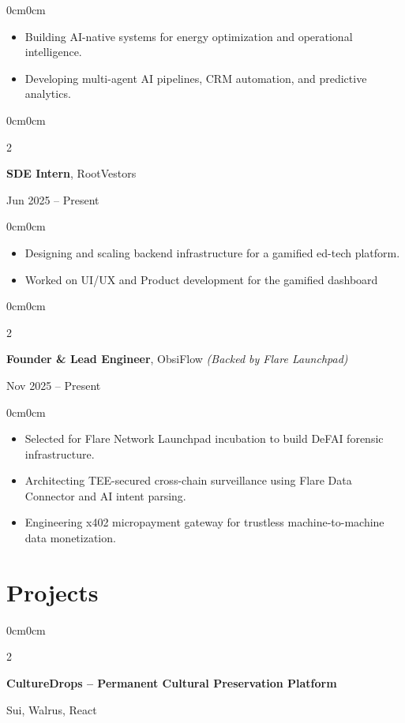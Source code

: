 \documentclass[10pt, letterpaper]{article}
\newenvironment{highlights}{
\begin{itemize}[topsep=1pt, parsep=0pt, partopsep=0pt, itemsep=1pt, leftmargin=10pt]
}{\end{itemize}}
\newenvironment{onecolentry}{\begin{adjustwidth}{0cm}{0cm}}{\end{adjustwidth}}
\newenvironment{twocolentry}[1]{
  \onecolentry
  \def\secondColumn{#1}
  \setcolumnwidth{\fill, 4.3cm}
  \begin{paracol}{2}
}{
  \switchcolumn \raggedleft \secondColumn
  \end{paracol}
  \endonecolentry
}
\begin{document}
\begin{onecolentry}
\begin{highlights}
  \item Building AI-native systems for energy optimization and operational intelligence.
  \item Developing multi-agent AI pipelines, CRM automation, and predictive analytics.
\end{highlights}
\end{onecolentry}

\begin{twocolentry}{Jun 2025 -- Present}
\textbf{SDE Intern}, RootVestors
\end{twocolentry}

\begin{onecolentry}
\begin{highlights}
  \item Designing and scaling backend infrastructure for a gamified ed-tech platform.  
  \item Worked on UI/UX and Product development for the gamified dashboard  
\end{highlights}
\end{onecolentry}

\begin{twocolentry}{Nov 2025 -- Present}
\textbf{Founder \& Lead Engineer}, ObsiFlow \textit{(Backed by Flare Launchpad)}
\end{twocolentry}

\begin{onecolentry}
\begin{highlights}
  \item Selected for Flare Network Launchpad incubation to build DeFAI forensic infrastructure.
  \item Architecting TEE-secured cross-chain surveillance using Flare Data Connector and AI intent parsing.
  \item Engineering x402 micropayment gateway for trustless machine-to-machine data monetization.
\end{highlights}
\end{onecolentry}

\section{Projects}

\begin{twocolentry}{Sui, Walrus, React}
\textbf{CultureDrops – Permanent Cultural Preservation Platform}
\end{twocolentry}
\end{document}
